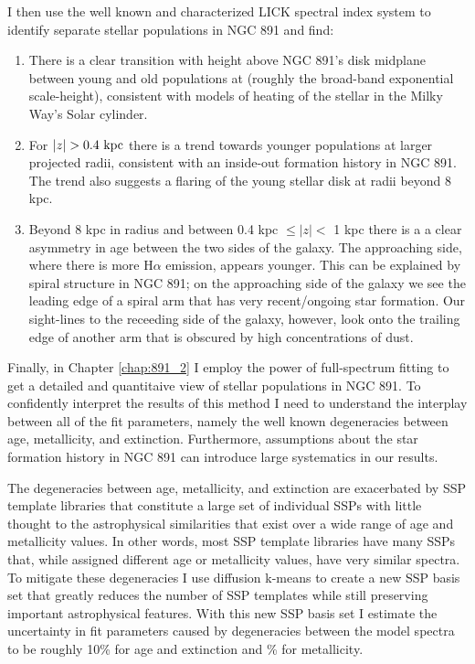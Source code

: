 I then use the well known and characterized LICK spectral index system
to identify separate stellar populations in NGC 891 and find:
\begin{enumerate}

   \item There is a clear transition with height above NGC 891's disk
     midplane between young and old populations at 
     (roughly the broad-band exponential scale-height), consistent
     with models of heating of the stellar in the Milky Way's Solar
     cylinder.

  \item For $|z| > 0.4~\mathrm{kpc} $ there is a trend towards younger
    populations at larger projected radii, consistent with an
    inside-out formation history in NGC 891. The trend also suggests a
    flaring of the young stellar disk at radii beyond 8 kpc.

  \item Beyond 8 kpc in radius and between 0.4 kpc $\leq |z| <$ 1 kpc
    there is a a clear asymmetry in age between the two sides of the
    galaxy. The approaching side, where there is more H$\alpha$
    emission, appears younger. This can be explained by spiral
    structure in NGC 891; on the approaching side of the galaxy we see
    the leading edge of a spiral arm that has very recent/ongoing star
    formation. Our sight-lines to the receeding side of the galaxy,
    however, look onto the trailing edge of another arm that is
    obscured by high concentrations of dust.

\end{enumerate}

Finally, in Chapter \ref{chap:891_2} I employ the power of
full-spectrum fitting to get a detailed and quantitaive view of
stellar populations in NGC 891. To confidently interpret the results
of this method I need to understand the interplay between all of the
fit parameters, namely the well known degeneracies between age,
metallicity, and extinction. Furthermore, assumptions about the star
formation history in NGC 891 can introduce large systematics in our
results.

The degeneracies between age, metallicity, and extinction are
exacerbated by SSP template libraries that constitute a large set of
individual SSPs with little thought to the astrophysical similarities
that exist over a wide range of age and metallicity values. In other
words, most SSP template libraries have many SSPs that, while assigned
different age or metallicity values, have very similar spectra. To
mitigate these degeneracies I use diffusion k-means to create a new
SSP basis set that greatly reduces the number of SSP templates while
still preserving important astrophysical features. With this new SSP
basis set I estimate the uncertainty in fit parameters caused by
degeneracies between the model spectra to be roughly 10\% for age and
extinction and \% for metallicity.

